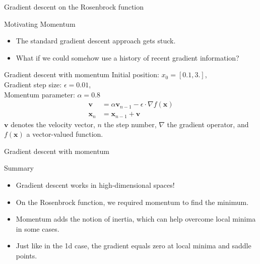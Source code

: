 \documentclass[notes]{beamer}
\begin{document}
    \begin{frame}{Gradient descent on the Rosenbrock function}
      \centering
    \end{frame}

    \begin{frame}{Motivating Momentum}
      \begin{itemize}
        \item The standard gradient descent approach gets stuck.
        \item What if we could somehow use a history of recent gradient information?
      \end{itemize}
    \end{frame}

    \begin{frame}{Gradient descent with momentum}
      Initial position: $x_0 = [0.1, 3.]$, \\
      Gradient step size: $\epsilon = 0.01 $, \\
      Momentum parameter: $\alpha = 0.8$
      \begin{align}
        \mathbf{v} &= \alpha \mathbf{v}_{n-1} - \epsilon \cdot \nabla f(\mathbf{x}) \\
        \mathbf{x}_n &= \mathbf{x}_{n-1} + \mathbf{v}
      \end{align}
      $\mathbf{v}$ denotes the velocity vector, 
      $n$ the step number, $\nabla$ the gradient operator, and $f(\mathbf{x})$ a vector-valued function.
    \end{frame}


    \begin{frame}{Gradient descent with momentum}
      \centering
    \end{frame}


    \begin{frame}{Summary}
      \begin{itemize}
        \item Gradient descent works in high-dimensional spaces!
        \item On the Rosenbrock function, we required momentum to find the minimum.
        \item Momentum adds the notion of inertia, which can help overcome local minima in some cases.
        \item Just like in the 1d case, the gradient equals zero at local minima and saddle points.
      \end{itemize}
    \end{frame}
\end{document}
